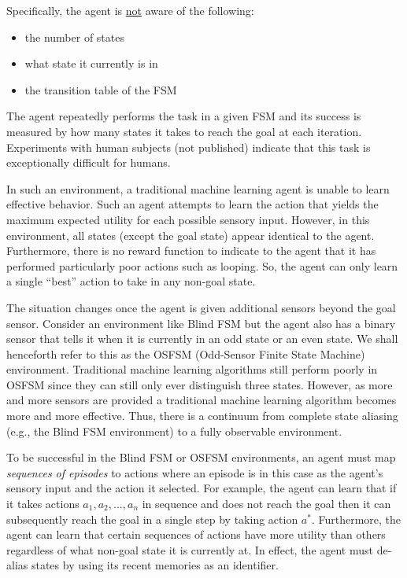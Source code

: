 \documentclass[letterpaper]{article} %
\begin{document}
\bigskip  %

Specifically, the agent is \underline{not} aware of the following:
\begin{itemize}
\item the number of states
\item what state it currently is in
\item the transition table of the FSM
\end{itemize}

The agent repeatedly performs the task in a given FSM and its success
is measured by how many states it takes to reach the goal at each
iteration.  Experiments with human subjects (not published) indicate
that this task is exceptionally difficult for humans.

In such an environment, a traditional machine learning agent is unable
to learn effective behavior.  Such an agent attempts to learn the
action that yields the maximum expected utility for each possible
sensory input.  However, in this environment, all states (except the
goal state) appear identical to the agent. Furthermore, there is no reward function to indicate to the agent that it has performed particularly poor actions such as looping. So, the agent can only learn a single ``best'' action to take in any non-goal state.

The situation changes once the agent is given additional sensors
beyond the goal sensor.  Consider an environment like Blind FSM but
the agent also has a binary sensor that tells it when it is currently
in an odd state or an even state.  We shall henceforth refer to this
as the OSFSM (Odd-Sensor Finite State Machine) environment. Traditional machine learning algorithms still perform poorly in OSFSM since they can still only ever distinguish three
states.  However, as more and more sensors are provided a traditional
machine learning algorithm becomes more and more effective.  Thus,
there is a continuum from complete state aliasing (e.g., the Blind FSM
environment) to a fully observable environment.

To be successful in the Blind FSM or OSFSM environments, an agent must map
\textit{sequences of episodes} to actions where an episode is in this
case as the agent's sensory input and the action it selected.  For
example, the agent can learn that if it takes actions $a_1, a_2, ..., a_n$
in sequence and does not reach the goal then it can subsequently
reach the goal in a single step by taking action $a^*$.  Furthermore,
the agent can learn that certain sequences of actions have more
utility than others regardless of what non-goal state it is currently
at. In effect, the agent must de-alias states by using its recent memories as an identifier.
\end{document}
